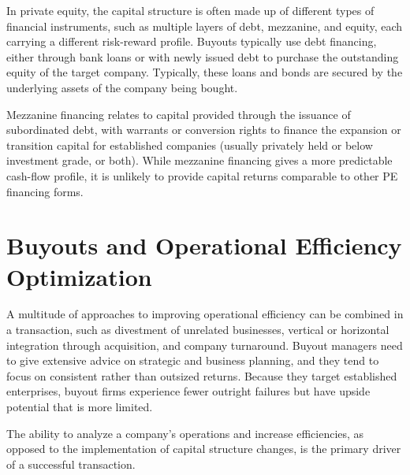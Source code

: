 \documentclass[11pt]{article}
\begin{document}
In private equity, the capital structure is often made up of different types of financial instruments, such as multiple layers of debt, mezzanine, and equity, each carrying a different risk-reward profile. Buyouts typically use debt financing, either through bank loans or with newly issued debt to purchase the outstanding equity of the target company. Typically, these loans and bonds are secured by the underlying assets of the company being bought.

Mezzanine financing relates to capital provided through the issuance of subordinated debt, with warrants or conversion rights to finance the expansion or transition capital for established companies (usually privately held or below investment grade, or both). While mezzanine financing gives a more predictable cash-flow profile, it is unlikely to provide capital returns comparable to other PE financing forms.

\section*{Buyouts and Operational Efficiency Optimization}
A multitude of approaches to improving operational efficiency can be combined in a transaction, such as divestment of unrelated businesses, vertical or horizontal integration through acquisition, and company turnaround. Buyout managers need to give extensive advice on strategic and business planning, and they tend to focus on consistent rather than outsized returns. Because they target established enterprises, buyout firms experience fewer outright failures but have upside potential that is more limited.

The ability to analyze a company's operations and increase efficiencies, as opposed to the implementation of capital structure changes, is the primary driver of a successful transaction.
\end{document}
